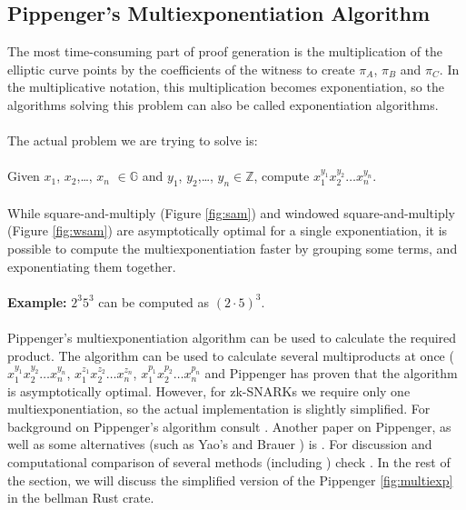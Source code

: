 \subsection{Pippenger's Multiexponentiation Algorithm}
The most time-consuming part of proof generation is the multiplication of the elliptic curve points by the coefficients of the witness to create $\pi_A$, $\pi_B$ and $\pi_C$. In the multiplicative notation, this multiplication becomes exponentiation, so the algorithms solving this problem can also be called exponentiation algorithms.\\
\\
The actual problem we are trying to solve is:\\
\\
Given $x_1$, $x_2$,\dots, $x_n$ $\in \mathbb{G}$ and $y_1$, $y_2$,\dots, $y_n \in \mathbb{Z}$, compute $x_1^{y_1} x_2^{y_2} \dots x_n^{y_n}$.\\
\\
While square-and-multiply (Figure \ref{fig:sam}) and windowed square-and-multiply (Figure \ref{fig:wsam}) are asymptotically optimal for a single exponentiation, it is possible to compute the multiexponentiation faster by grouping some terms, and exponentiating them together.\\
\\
\textbf{Example:} $2^3 5^3$ can be computed as $(2 \cdot 5)^3$.\\
\\
Pippenger's multiexponentiation algorithm \cite{pippenger1976evaluation} can be used to calculate the required product. The algorithm can be used to calculate several multiproducts at once ($x_1^{y_1} x_2^{y_2} \dots x_n^{y_n}$, $x_1^{z_1} x_2^{z_2} \dots x_n^{z_n}$, $x_1^{p_1} x_2^{p_2} \dots x_n^{p_n}$ and Pippenger has proven that the algorithm is asymptotically optimal. However, for zk-SNARKs we require only one multiexponentiation, so the actual implementation is slightly simplified. For background on Pippenger's algorithm consult \cite{henry2010pippenger}. Another paper on Pippenger, as well as some alternatives (such as Yao's \cite{yao1976evaluation} and Brauer \cite{brauer1939addition}) is \cite{bernstein2002pippenger3s}. For discussion and computational comparison of several methods (including \cite{bos1989addition}) check \cite{bergeron1994efficient}. In the rest of the section, we will discuss the simplified version of the Pippenger \ref{fig:multiexp} in the bellman Rust crate.
